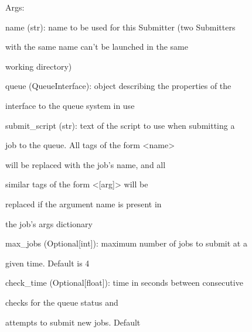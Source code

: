 \documentclass[letterpaper,10pt,english]{sphinxmanual}
\begin{document}
\begin{fulllineitems}
\begin{DUlineblock}{0em}
\item[] Args:
\item[]
\begin{DUlineblock}{\DUlineblockindent}
\item[] name (str): name to be used for this Submitter (two Submitters
\item[]
\begin{DUlineblock}{\DUlineblockindent}
\item[] with the same name can't be launched in the same
\item[] working directory)
\end{DUlineblock}
\item[] queue (QueueInterface): object describing the properties of the
\item[]
\begin{DUlineblock}{\DUlineblockindent}
\item[] interface to the queue system in use
\end{DUlineblock}
\item[] submit\_script (str): text of the script to use when submitting a
\item[]
\begin{DUlineblock}{\DUlineblockindent}
\item[] job to the queue. All tags of the form \textless{}name\textgreater{}
\item[] will be replaced with the job's name, and all
\item[] similar tags of the form \textless{}{[}arg{]}\textgreater{} will be
\item[] replaced if the argument name is present in
\item[] the job's args dictionary
\end{DUlineblock}
\item[] max\_jobs (Optional{[}int{]}): maximum number of jobs to submit at a
\item[]
\begin{DUlineblock}{\DUlineblockindent}
\item[] given time. Default is 4
\end{DUlineblock}
\item[] check\_time (Optional{[}float{]}): time in seconds between consecutive
\item[]
\begin{DUlineblock}{\DUlineblockindent}
\item[] checks for the queue status and
\item[] attempts to submit new jobs. Default

\end{DUlineblock}
\end{DUlineblock}
\end{DUlineblock}
\end{fulllineitems}
\end{document}
